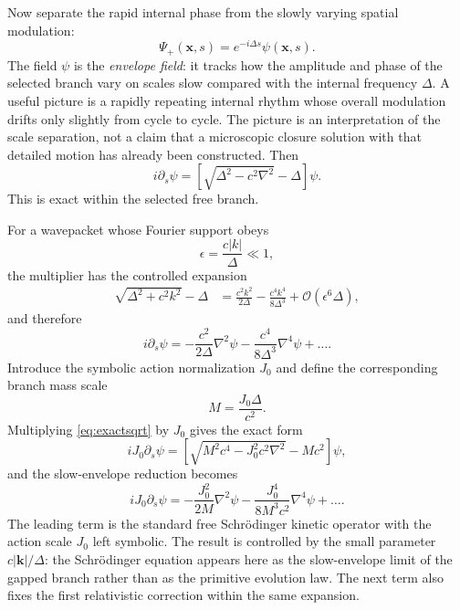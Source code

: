 \documentclass[11pt]{article}
\theoremstyle{definition}
\newcommand{\Order}{\mathcal{O}}
\begin{document}
Now separate the rapid internal phase from the slowly varying spatial modulation:
\begin{equation}
 \Psi_+(\mathbf x,s)=e^{-i\Delta s}\psi(\mathbf x,s).
\end{equation}
The field $\psi$ is the \emph{envelope field}: it tracks how the amplitude and phase of the
selected branch vary on scales slow compared with the internal frequency $\Delta$.  A useful
picture is a rapidly repeating internal rhythm whose overall modulation drifts only slightly
from cycle to cycle.  The picture is an interpretation of the scale separation, not a claim
that a microscopic closure solution with that detailed motion has already been constructed.
Then
\begin{equation}
 \boxed{
 i\partial_s\psi=
 \left[\sqrt{\Delta^2-c^2\nabla^2}-\Delta\right]\psi.}
 \label{eq:exactsqrt}
\end{equation}
This is exact within the selected free branch.

For a wavepacket whose Fourier support obeys
\begin{equation}
 \epsilon=\frac{c|k|}{\Delta}\ll1,
 \label{eq:epsilon}
\end{equation}
the multiplier has the controlled expansion
\begin{align}
 \sqrt{\Delta^2+c^2k^2}-\Delta
 &=\frac{c^2k^2}{2\Delta}-\frac{c^4k^4}{8\Delta^3}
 +\Order(\epsilon^6\Delta),
\end{align}
and therefore
\begin{equation}
 \boxed{
 i\partial_s\psi=
 -\frac{c^2}{2\Delta}\nabla^2\psi
 -\frac{c^4}{8\Delta^3}\nabla^4\psi+\ldots.}
 \label{eq:slowplain}
\end{equation}
Introduce the symbolic action normalization $J_0$ and define the corresponding branch mass
scale
\begin{equation}
 \boxed{M=\frac{J_0\Delta}{c^2}}.
 \label{eq:Mdef}
\end{equation}
Multiplying \eqref{eq:exactsqrt} by $J_0$ gives the exact form
\begin{equation}
 iJ_0\partial_s\psi=
 \left[\sqrt{M^2c^4-J_0^2c^2\nabla^2}-Mc^2\right]\psi,
 \label{eq:exactsqrtJ}
\end{equation}
and the slow-envelope reduction becomes
\begin{equation}
 \boxed{
 iJ_0\partial_s\psi=
 -\frac{J_0^2}{2M}\nabla^2\psi
 -\frac{J_0^4}{8M^3c^2}\nabla^4\psi+\ldots.}
 \label{eq:schbridge}
\end{equation}
The leading term is the standard free Schr\"odinger kinetic operator with the action scale
$J_0$ left symbolic.  The result is controlled by the small parameter
$c|\mathbf k|/\Delta$: the Schrödinger equation appears here as the slow-envelope limit of the
gapped branch rather than as the primitive evolution law.  The next term also fixes the first
relativistic correction within the same expansion.
\end{document}
